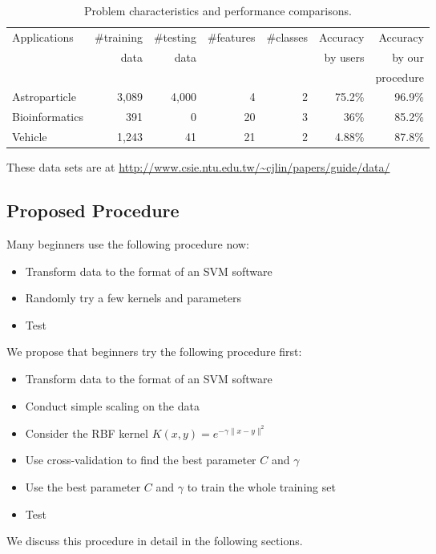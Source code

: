 \documentclass[12pt]{article}
\begin{document}
\begin{table}
\caption{Problem characteristics and performance comparisons.}
\label{accuracy}
\begin{center}
\begin{tabular}{@{}l|r|r|r|r|r|r@{}}
Applications&\#training&\#testing&\#features&\#classes&Accuracy&Accuracy \\
                &data      &data     &          &       &by users&by our   \\
                &          &         &          &       &        &procedure\\
\hline
Astroparticle\footnotemark[1] & 3,089 & 4,000 & 4 & 2 & 75.2\% & 96.9\% \\
Bioinformatics\footnotemark[2] & 391 & 0\footnotemark[4] & 20 & 3 & 36\% & 85.2\% \\
Vehicle\footnotemark[3] & 1,243 & 41 & 21 & 2 & 4.88\% & 87.8\%
\end{tabular}
\end{center}
\end{table}


These data sets are at \url{http://www.csie.ntu.edu.tw/~cjlin/papers/guide/data/}

\subsection{Proposed Procedure}

Many beginners use the following procedure now:
\begin{itemize}
\item Transform data to the format of an SVM software
\item Randomly try a few kernels and parameters
\item Test
\end{itemize}
We propose that beginners try the following procedure first:
\begin{itemize}
\item Transform data to the format of an SVM software
\item Conduct simple scaling on the data
\item Consider the RBF kernel $K(x,y)=e^{-\gamma\|x-y\|^2}$ 
\item Use cross-validation to find the best parameter
      $C$ and $\gamma$
\item Use the best parameter $C$ and $\gamma$ to train the 
whole training set\footnotemark[5]
\item Test
\end{itemize}
We discuss this procedure in detail in the following 
sections.
\end{document}
